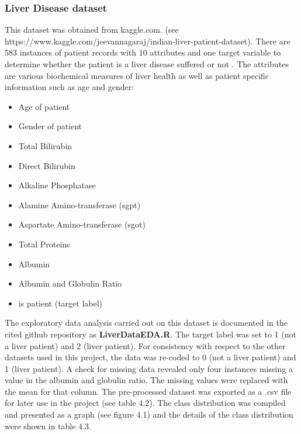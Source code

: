 \subsubsection{Liver Disease dataset}
This dataset was obtained from kaggle.com.\newline
(see https://www.kaggle.com/jeevannagaraj/indian-liver-patient-dataset). \newline
There are 583 instances of patient records with 10 attributes and one target variable to determine whether the patient is a liver disease suffered or not \citep{Ramana:2011tn}. The attributes are various biochemical measures of liver health as well as patient specific information such as age and gender:
\begin{itemize}
    \item Age of patient
    \item Gender of patient
    \item Total Bilirubin
    \item Direct Bilirubin
    \item Alkaline Phosphatase
    \item Alamine Amino-transferase (sgpt)
    \item Aspartate Amino-transferase (sgot)
    \item Total Proteins
    \item Albumin
    \item Albumin and Globulin Ratio
    \item is patient (target label)
\end{itemize}

The exploratory data analysis carried out on this dataset is documented in the cited github repository as \textbf{LiverDataEDA.R}.\newline
The target label was set to 1 (not a liver patient) and 2 (liver patient). For consistency with respect to the other datasets used in this project, the data was re-coded to 0 (not a liver patient) and 1 (liver patient).\newline
A check for missing data revealed only four instances missing a value in the albumin and globulin ratio. The missing values were replaced with the mean for that column.\newline
The pre-processed dataset was exported as a .csv file for later use in the project (see table 4.2).\newline
The class distribution was compiled and presented as a graph (see figure 4.1) and the details of the class distribution were shown in table 4.3.\newline


